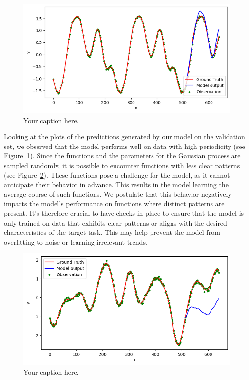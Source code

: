 \documentclass{article}
\theoremstyle{plain}
\theoremstyle{definition}
\theoremstyle{remark}
\begin{document}
\begin{figure}[h!]
    \centering
    \includegraphics[width=\linewidth]{assets/validation1.png}
    \caption{Your caption here.}
    \label{fig:validation1}
\end{figure}
Looking at the plots of the predictions generated by our model on the validation set, we observed that the model performs well on data with high periodicity (see Figure~\ref{fig:validation1}). Since the functions and the parameters for the Gaussian process are sampled randomly, it is possible to encounter functions with less clear patterns (see Figure~\ref{fig:validation2}). These functions pose a challenge for the model, as it cannot anticipate their behavior in advance. This results in the model learning the average course of such functions. We postulate that this behavior negatively impacts the model's performance on functions where distinct patterns are present. It's therefore crucial to have checks in place to ensure that the model is only trained on data that exhibits clear patterns or aligns with the desired characteristics of the target task. This may help prevent the model from overfitting to noise or learning irrelevant trends.

 
\begin{figure}[h!]
    \centering
    \includegraphics[width=\linewidth]{assets/validation2.png}
    \caption{Your caption here.}
    \label{fig:validation2}
\end{figure}
\end{document}
